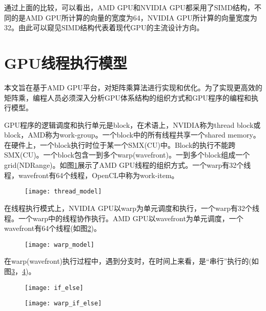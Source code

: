 通过上面的比较，可以看出，AMD GPU和NVIDIA GPU都采用了SIMD结构，不同的是AMD GPU所计算的向量的宽度为64，NVIDIA GPU所计算的向量宽度为32。由此可以窥见SIMD结构代表着现代GPU的主流设计方向。




\section{GPU线程执行模型}
本文旨在基于AMD GPU平台，对矩阵乘算法进行实现和优化。为了实现更高效的矩阵乘，编程人员必须深入分析GPU体系结构的组织方式和GPU程序的编程和执行模型。

GPU程序的逻辑调度和执行单元是block，在术语上，NVIDIA称为thread block或block，AMD称为work-group。一个block中的所有线程共享一个shared memory。在硬件上，一个block执行时位于某一个SMX(CU)中。Block的执行不能跨SMX(CU)。一个block包含一到多个warp(wavefront)。一到多个block组成一个grid(NDRange)。如图\ref{fig:thread_model}展示了AMD GPU线程的组织方式。一个warp有32个线程，wavefront有64个线程，OpenCL中称为work-item。

\begin{figure}[htbp]
	\centering
	\texttt{[image: thread\_model]}
	\label{fig:thread_model}
\end{figure}

在线程执行模式上，NVIDIA GPU以warp为单元调度和执行，一个warp有32个线程。一个warp中的线程协作执行。AMD GPU以wavefront为单元调度，一个wavefront有64个线程(如图\ref{fig:warp_model})。

\begin{figure}[htbp]
	\centering
	\texttt{[image: warp\_model]}
	\label{fig:warp_model}
\end{figure}

在warp(wavefront)执行过程中，遇到分支时，在时间上来看，是“串行”执行的(如图\ref{fig:if_else}，\ref{fig:warp_if_else})。

\begin{figure}[htbp]
	\centering
	\texttt{[image: if\_else]}
	\label{fig:if_else}
\end{figure}

\begin{figure}[htbp]
	\centering
	\texttt{[image: warp\_if\_else]}
	\label{fig:warp_if_else}
\end{figure}

